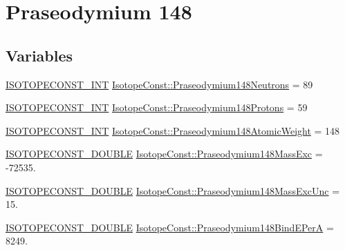 \hypertarget{group___isotope_const-_praseodymium-_pr148}{}\section{Praseodymium 148}
\label{group___isotope_const-_praseodymium-_pr148}
\subsection*{Variables}
\begin{DoxyCompactItemize}
\item 
\mbox{\hyperlink{group___isotope_const-_macros_ga5f18360b3e99483a35c32d789e62621c}{I\+S\+O\+T\+O\+P\+E\+C\+O\+N\+S\+T\+\_\+\+I\+NT}} \mbox{\hyperlink{group___isotope_const-_praseodymium-_pr148_gaf2626cc3f38b12ce2e671232e3f3af05}{Isotope\+Const\+::\+Praseodymium148\+Neutrons}} = 89
\item 
\mbox{\hyperlink{group___isotope_const-_macros_ga5f18360b3e99483a35c32d789e62621c}{I\+S\+O\+T\+O\+P\+E\+C\+O\+N\+S\+T\+\_\+\+I\+NT}} \mbox{\hyperlink{group___isotope_const-_praseodymium-_pr148_ga5943eff9f8db7dd50465c9ed0b5cf8b3}{Isotope\+Const\+::\+Praseodymium148\+Protons}} = 59
\item 
\mbox{\hyperlink{group___isotope_const-_macros_ga5f18360b3e99483a35c32d789e62621c}{I\+S\+O\+T\+O\+P\+E\+C\+O\+N\+S\+T\+\_\+\+I\+NT}} \mbox{\hyperlink{group___isotope_const-_praseodymium-_pr148_ga7051f4433b3e8ff999fa92bd0d8e4dae}{Isotope\+Const\+::\+Praseodymium148\+Atomic\+Weight}} = 148
\item 
\mbox{\hyperlink{group___isotope_const-_macros_ga8f45a7272ce02c0b4c65c44636ed719a}{I\+S\+O\+T\+O\+P\+E\+C\+O\+N\+S\+T\+\_\+\+D\+O\+U\+B\+LE}} \mbox{\hyperlink{group___isotope_const-_praseodymium-_pr148_ga8c274cc8b8b7048c7614dea58a148f01}{Isotope\+Const\+::\+Praseodymium148\+Mass\+Exc}} = -\/72535.
\item 
\mbox{\hyperlink{group___isotope_const-_macros_ga8f45a7272ce02c0b4c65c44636ed719a}{I\+S\+O\+T\+O\+P\+E\+C\+O\+N\+S\+T\+\_\+\+D\+O\+U\+B\+LE}} \mbox{\hyperlink{group___isotope_const-_praseodymium-_pr148_ga4259f4894c81c59f0fa05e580ce2fe4d}{Isotope\+Const\+::\+Praseodymium148\+Mass\+Exc\+Unc}} = 15.
\item 
\mbox{\hyperlink{group___isotope_const-_macros_ga8f45a7272ce02c0b4c65c44636ed719a}{I\+S\+O\+T\+O\+P\+E\+C\+O\+N\+S\+T\+\_\+\+D\+O\+U\+B\+LE}} \mbox{\hyperlink{group___isotope_const-_praseodymium-_pr148_ga948dd728754cb2f2242c3c149684a41b}{Isotope\+Const\+::\+Praseodymium148\+Bind\+E\+PerA}} = 8249.

\end{DoxyCompactItemize}
